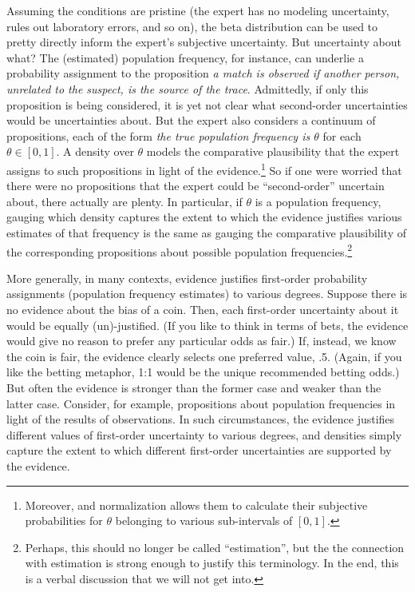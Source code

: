 \documentclass[
  10pt,
  dvipsnames,enabledeprecatedfontcommands]{scrartcl}
\begin{document}
Assuming the conditions are pristine (the expert has no modeling
uncertainty, rules out laboratory errors, and so on), the beta
distribution can be used to pretty directly inform the expert's
subjective uncertainty. But uncertainty about what? The (estimated)
population frequency, for instance, can underlie a probability
assignment to the proposition
\emph{a match is observed  if another person, unrelated to the suspect, is the source of the trace}.
Admittedly, if only this proposition is being considered, it is yet not
clear what second-order uncertainties would be uncertainties about. But
the expert also considers a continuum of propositions, each of the form
\emph{the true population frequency is $\theta$} for each
\(\theta\in [0,1]\). A density over \(\theta\) models the comparative
plausibility that the expert assigns to such propositions in light of
the
evidence.\footnote{Moreover, and normalization allows them to calculate their subjective probabilities for $\theta$ belonging to various sub-intervals of $[0,1]$.}
So if one were worried that there were no propositions that the expert
could be ``second-order'' uncertain about, there actually are plenty. In
particular, if \(\theta\) is a population frequency, gauging which
density captures the extent to which the evidence justifies various
estimates of that frequency is the same as gauging the comparative
plausibility of the corresponding propositions about possible population
frequencies.\footnote{Perhaps, this should no longer be called
  ``estimation'', but the the connection with estimation is strong
  enough to justify this terminology. In the end, this is a verbal
  discussion that we will not get into.}

More generally, in many contexts, evidence justifies first-order
probability assignments (population frequency estimates) to various
degrees. Suppose there is no evidence about the bias of a coin. Then,
each first-order uncertainty about it would be equally (un)-justified.
(If you like to think in terms of bets, the evidence would give no
reason to prefer any particular odds as fair.) If, instead, we know the
coin is fair, the evidence clearly selects one preferred value, .5.
(Again, if you like the betting metaphor, 1:1 would be the unique
recommended betting odds.) But often the evidence is stronger than the
former case and weaker than the latter case. Consider, for example,
propositions about population frequencies in light of the results of
observations. In such circumstances, the evidence justifies different
values of first-order uncertainty to various degrees, and densities
simply capture the extent to which different first-order uncertainties
are supported by the evidence.
\end{document}
